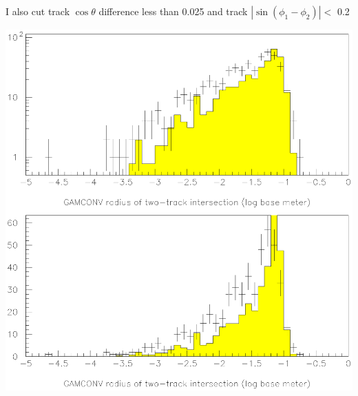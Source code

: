 \documentclass{article}
\begin{document}
\vfill

\mbox{ }

\pagebreak

\mbox{ }

\vfill

\begin{center} \huge I also cut track $\cos\theta$ difference less than 0.025 and track $|\sin(\phi_1-\phi_2)| <$ 0.2 \end{center}

\vfill

\includegraphics[width=\linewidth]{convstudy_gg_9.51.eps}

\vfill

\mbox{ }
\end{document}
